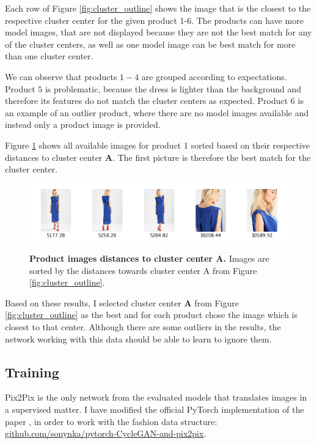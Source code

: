\documentclass[12pt]{report}
\begin{document}
Each row of Figure \ref{fig:cluster_outline} shows the image that is the closest to the respective cluster center for the given product 1-6. The products can have more model images, that are not displayed because they are not the best match for any of the cluster centers, as well as one model image can be best match for more than one cluster center. 

We can observe that products $1-4$ are grouped according to expectations. Product $5$ is problematic, because the dress is lighter than the background and therefore its features do not match the cluster centers as expected. Product $6$ is an example of an outlier product, where there are no model images available and instead only a product image is provided.

Figure \ref{fig:cluster_outline_distances} shows all available images for product 1 sorted based on their respective distances to cluster center \textbf{A}. The first picture is therefore the best match for the cluster center.

\begin{figure}[h]
\centering
{\includegraphics[width=\linewidth]{04_experiments/clustering/outlines_distances}}
\caption{\label{fig:cluster_outline_distances} \textbf{Product images distances to cluster center A.} Images are sorted by the distances towards cluster center A from Figure \ref{fig:cluster_outline}.}
\end{figure}

Based on these results, I selected cluster center \textbf{A} from Figure \ref{fig:cluster_outline} as the best and for each product chose the image which is closest to that center. Although there are some outliers in the results, the network working with this data should be able to learn to ignore them.

\pagebreak
\subsection{Training}
Pix2Pix \cite{isola_image--image_2016} is the only network from the evaluated models that translates images in a supervised matter. I have modified the official PyTorch implementation of the paper \cite{noauthor_junyanz/pytorch-cyclegan-and-pix2pix_nodate}, in order to work with the fashion data structure: \hyperlink{https://github.com/sonynka/pytorch-CycleGAN-and-pix2pix}{github.com/sonynka/pytorch-CycleGAN-and-pix2pix}.
\end{document}
